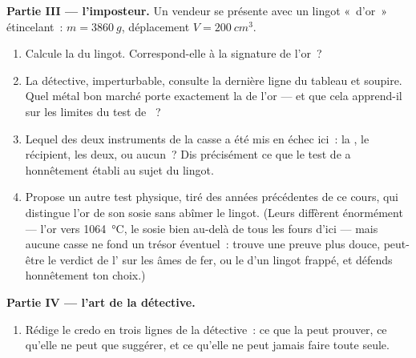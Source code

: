 \begin{problem}
\medskip\noindent\textbf{Partie III --- l'imposteur.}
Un vendeur se présente avec un lingot «~d'or~» étincelant~:
$m = \qty{3860}{g}$, déplacement $V = \qty{200}{cm^3}$.
\begin{enumerate}[resume]
  \item Calcule la  du lingot. Correspond-elle à la
        signature de l'or~?
  \item La détective, imperturbable, consulte la dernière ligne du
        tableau et soupire. Quel métal bon marché porte exactement
        la  de l'or --- et que cela apprend-il sur
        les limites du test de ~?
  \item Lequel des deux instruments de la casse a été mis en échec
        ici~: la , le récipient, les deux, ou aucun~? Dis
        précisément ce que le test de  a
        honnêtement établi au sujet du lingot.
  \item Propose un autre test physique, tiré des années
        précédentes de ce cours, qui distingue l'or de son sosie
        sans abîmer le lingot. (Leurs 
        diffèrent énormément --- l'or vers \qty{1064}{\celsius}, le
        sosie bien au-delà de tous les fours d'ici --- mais aucune
        casse ne fond un trésor éventuel~: trouve une preuve plus
        douce, peut-être le verdict de l' sur les âmes de
        fer, ou le  d'un lingot frappé, et défends honnêtement
        ton choix.)
\end{enumerate}

\medskip\noindent\textbf{Partie IV --- l'art de la détective.}
\begin{enumerate}[resume]
  \item Rédige le credo en trois lignes de la détective~: ce que la
         peut prouver, ce qu'elle ne peut que
        suggérer, et ce qu'elle ne peut jamais faire toute seule.
\end{enumerate}
\end{problem}
